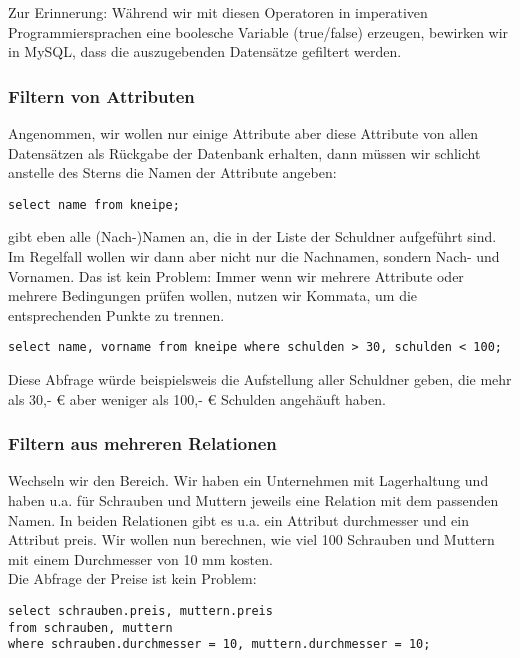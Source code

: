\begin{verbatimg}
Zur Erinnerung: Während wir mit diesen Operatoren in imperativen Programmiersprachen eine boolesche Variable (true/false) erzeugen, bewirken wir in MySQL, dass die auszugebenden Datensätze gefiltert werden.

\subsubsection{Filtern von Attributen}

Angenommen, wir wollen nur einige Attribute aber diese Attribute von allen Datensätzen als Rückgabe der Datenbank erhalten, dann müssen wir schlicht anstelle des Sterns die Namen der Attribute angeben:\\

\begin{verbatim}
select name from kneipe;
\end{verbatim}

gibt eben alle (Nach-)Namen an, die in der Liste der Schuldner aufgeführt sind. Im Regelfall wollen wir dann aber nicht nur die Nachnamen, sondern Nach- und Vornamen. Das ist kein Problem: Immer wenn wir mehrere Attribute oder mehrere Bedingungen prüfen wollen, nutzen wir Kommata, um die entsprechenden Punkte zu trennen.

\begin{verbatim}
select name, vorname from kneipe where schulden > 30, schulden < 100;
\end{verbatim}

Diese Abfrage würde beispielsweis die Aufstellung aller Schuldner geben, die mehr als 30,- € aber weniger als 100,- € Schulden angehäuft haben.

\subsubsection{Filtern aus mehreren Relationen}

Wechseln wir den Bereich. Wir haben ein Unternehmen mit Lagerhaltung und haben u.a. für Schrauben und Muttern jeweils eine Relation mit dem passenden Namen. In beiden Relationen gibt es u.a. ein Attribut durchmesser und ein Attribut preis. Wir wollen nun berechnen, wie viel 100 Schrauben und Muttern mit einem Durchmesser von 10 mm kosten.\\


Die Abfrage der Preise ist kein Problem:

\begin{verbatim}
select schrauben.preis, muttern.preis 
from schrauben, muttern 
where schrauben.durchmesser = 10, muttern.durchmesser = 10;
\end{verbatim}


\end{verbatimg}
